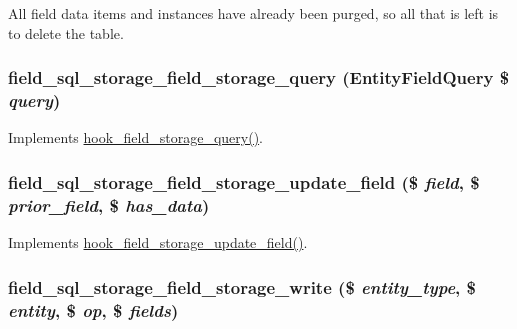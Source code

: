 All field data items and instances have already been purged, so all that is left is to delete the table. \hypertarget{field__sql__storage_8module_a39226b4cd56767ac4bce73474bc67f32}{
\subsubsection[{field\_\-sql\_\-storage\_\-field\_\-storage\_\-query}]{\setlength{\rightskip}{0pt plus 5cm}field\_\-sql\_\-storage\_\-field\_\-storage\_\-query ({\bf EntityFieldQuery} \$ {\em query})}}
\label{field__sql__storage_8module_a39226b4cd56767ac4bce73474bc67f32}
Implements \hyperlink{group__field__storage_gaf46795ee1b678a72b4457b524303c794}{hook\_\-field\_\-storage\_\-query()}. \hypertarget{field__sql__storage_8module_ac746a9fbb07c5bb7d954bf12301a1d30}{
\subsubsection[{field\_\-sql\_\-storage\_\-field\_\-storage\_\-update\_\-field}]{\setlength{\rightskip}{0pt plus 5cm}field\_\-sql\_\-storage\_\-field\_\-storage\_\-update\_\-field (\$ {\em field}, \/  \$ {\em prior\_\-field}, \/  \$ {\em has\_\-data})}}
\label{field__sql__storage_8module_ac746a9fbb07c5bb7d954bf12301a1d30}
Implements \hyperlink{group__field__types_gae38c5e194a4bf43e2af3dba6b62da25b}{hook\_\-field\_\-storage\_\-update\_\-field()}. \hypertarget{field__sql__storage_8module_ac365998e2e667d3521edacc843ca8640}{
\subsubsection[{field\_\-sql\_\-storage\_\-field\_\-storage\_\-write}]{\setlength{\rightskip}{0pt plus 5cm}field\_\-sql\_\-storage\_\-field\_\-storage\_\-write (\$ {\em entity\_\-type}, \/  \$ {\em entity}, \/  \$ {\em op}, \/  \$ {\em fields})}}
